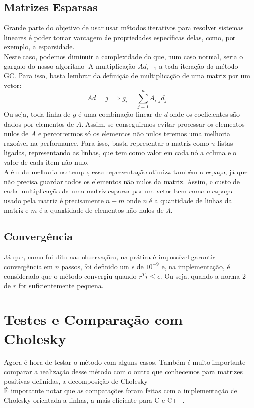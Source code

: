 \documentclass[
10pt, %
a4paper, %
oneside, %
headinclude,footinclude, %
BCOR5mm, %
]{scrartcl}
\begin{document}
\subsection{Matrizes Esparsas}
Grande parte do objetivo de usar usar métodos iterativos para resolver sistemas lineares é poder tomar vantagem de propriedades específicas delas, como, por exemplo, a esparsidade. \\
Neste caso, podemos diminuir a complexidade do que, num caso normal, seria o gargalo do nosso algoritmo. A multiplicação $Ad_{i-1}$ a toda iteração do método GC. Para isso, basta lembrar da definição de multiplicação de uma matriz por um vetor:
$$ Ad = g \implies g_i = \sum\limits_{j=1}^n A_{i,j}d_j $$
Ou seja, toda linha de $g$ é uma combinação linear de $d$ onde os coeficientes são dados por elementos de $A$. Assim, se conseguirmos evitar processar os elementos nulos de $A$ e percorrermos só os elementos não nulos teremos uma melhoria razoável na performance. Para isso, basta representar a matriz como $n$ listas ligadas, representando as linhas, que tem como valor em cada nó a coluna e o valor de cada item não nulo. \\
Além da melhoria no tempo, essa representação otimiza também o espaço, já que não precisa guardar todos os elementos não nulos da matriz. Assim, o custo de cada multiplicação da uma matriz esparsa por um vetor bem como o espaço usado pela matriz é precisamente $n+m$ onde $n$ é a quantidade de linhas da matriz e $m$ é a quantidade de elementos não-nulos de $A$. \\

\subsection{Convergência}
Já que, como foi dito nas observações, na prática é impossível garantir convergência em $n$ passos, foi definido um $\epsilon$ de $10^{-9}$ e, na implementação, é considerado que o método convergiu quando $r^Tr \leq \epsilon$. Ou seja, quando a norma 2 de $r$ for suficientemente pequena. \\

\section{Testes e Comparação com Cholesky}
Agora é hora de testar o método com alguns casos. Também é muito importante comparar a realização desse método com o outro que conhecemos para matrizes positivas definidas, a decomposição de Cholesky. \\
É imporatnte notar que as comparações foram feitas com a implementação de Cholesky orientada a linhas, a mais eficiente para C e C++.
\end{document}
